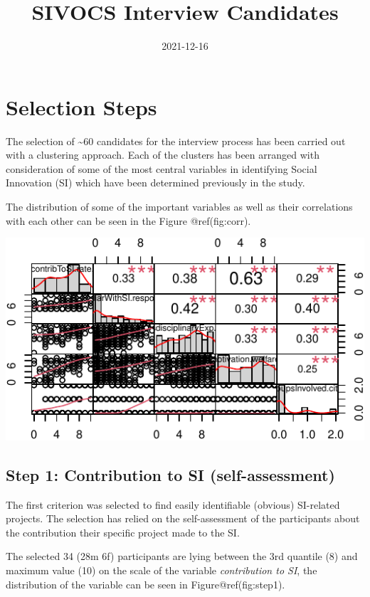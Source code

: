 \documentclass[]{tufte-book}
\title[Selection Criteria]{SIVOCS Interview Candidates}
\date{2021-12-16}
\begin{document}
\maketitle




\hypertarget{selection-steps}{%
\chapter{Selection Steps}\label{selection-steps}}

The selection of \textasciitilde60 candidates for the interview process
has been carried out with a clustering approach. Each of the clusters
has been arranged with consideration of some of the most central
variables in identifying Social Innovation (SI) which have been
determined previously in the study.

The distribution of some of the important variables as well as their
correlations with each other can be seen in the Figure @ref(fig:corr).

\includegraphics{03_SIVOCS_int-cand_files/figure-latex/corr-1}

\hypertarget{step-1-contribution-to-si-self-assessment}{%
\section{Step 1: Contribution to SI
(self-assessment)}\label{step-1-contribution-to-si-self-assessment}}

The first criterion was selected to find easily identifiable (obvious)
SI-related projects. The selection has relied on the self-assessment of
the participants about the contribution their specific project made to
the SI.

The selected 34 (28m \textbar{} 6f) participants are lying between the
3rd quantile (8) and maximum value (10) on the scale of the variable
\emph{contribution to SI}, the distribution of the variable can be seen
in Figure@ref(fig:step1).
\end{document}

